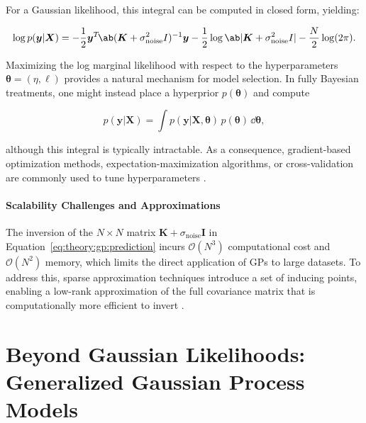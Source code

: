 For a Gaussian likelihood, this integral can be computed in closed form, yielding:

\begin{equation}\label{eq:theory:gp:marginal_likelihood_gaussian}
    \log p(\bm{y}|\bm{X}) = -\frac{1}{2}\bm{y}^T\!\ab (\bm{K}+\sigma_{\text{noise}}^2I)^{-1}\bm{y} - \frac{1}{2}\log \ab |\bm{K}+\sigma_{\text{noise}}^2I | - \frac{N}{2}\log(2\pi).
\end{equation}

Maximizing the log marginal likelihood with respect to the hyperparameters $\bm{\theta} = (\eta, \ell)$ provides a natural mechanism for model selection. In fully Bayesian treatments, one might instead place a hyperprior $p(\bm{\theta})$ and compute

\begin{equation}
    p(\bm{y}|\bm{X}) = \int p(\bm{y}|\bm{X}, \bm{\theta}) \, p(\bm{\theta}) \, \dd \bm{\theta},
\end{equation}

although this integral is typically intractable. As a consequence, gradient-based optimization methods, expectation-maximization algorithms, or cross-validation are commonly used to tune hyperparameters \cite[cf.][Chapter 5]{rasmussen_gaussian_2006}.


\paragraph{Scalability Challenges and Approximations} The inversion of the $N \times N$ matrix $\bm{K} + \sigma_{\text{noise}} \bm{I}$ in Equation~\eqref{eq:theory:gp:prediction} incurs $\mathcal{O}(N^3)$ computational cost and $\mathcal{O}(N^2)$ memory, which limits the direct application of GPs to large datasets. To address this, sparse approximation techniques introduce a set of inducing points, enabling a low-rank approximation of the full covariance matrix that is computationally more efficient to invert \cite[e.g.][]{quinonero-candela_unifying_2005,wilkinson_sparse_2021}.

\section{Beyond Gaussian Likelihoods: Generalized Gaussian Process Models}\label{sec:gp:generalized}

